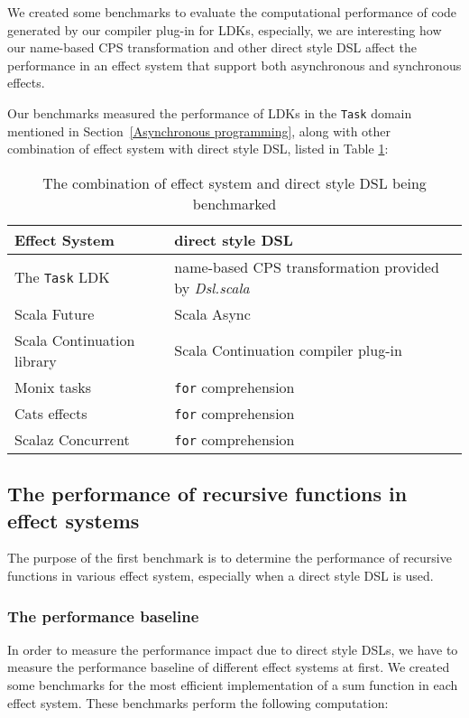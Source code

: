 We created some benchmarks to evaluate the computational performance of code generated by our compiler plug-in for LDKs, especially, we are interesting how our name-based CPS transformation and other direct style DSL affect the performance in an effect system that support both asynchronous and synchronous effects.

Our benchmarks measured the performance of LDKs in the \lstinline{Task} domain mentioned in Section~\ref{Asynchronous programming}, along with other combination of effect system with direct style DSL, listed in Table \ref{combination}:

\begin{table}[htbp]
  \begin{tabular}{l|l}
    Effect System & direct style DSL \\
    \hline
    The \texttt{Task} LDK & name-based CPS transformation provided by \textit{Dsl.scala} \\
    Scala Future \cite{haller2012sip} & Scala Async \cite{haller2013sip} \\
    Scala Continuation library \cite{rompf2009implementing} & Scala Continuation compiler plug-in \\
    Monix tasks \cite{nedelcu2017monix} & \texttt{for} comprehension \\
    Cats effects \cite{typelevel2017cats} & \texttt{for} comprehension \\
    Scalaz Concurrent \cite{kenji2017scalaz} & \texttt{for} comprehension \\
  \end{tabular}
  \caption{The combination of effect system and direct style DSL being benchmarked}
  \label{combination}
\end{table}

\subsection{The performance of recursive functions in effect systems}

The purpose of the first benchmark is to determine the performance of recursive functions in various effect system, especially when a direct style DSL is used.

\subsubsection{The performance baseline}

In order to measure the performance impact due to direct style DSLs, we have to measure the performance baseline of different effect systems at first. We created some benchmarks for the most efficient implementation of a sum function in each effect system. These benchmarks perform the following computation:

